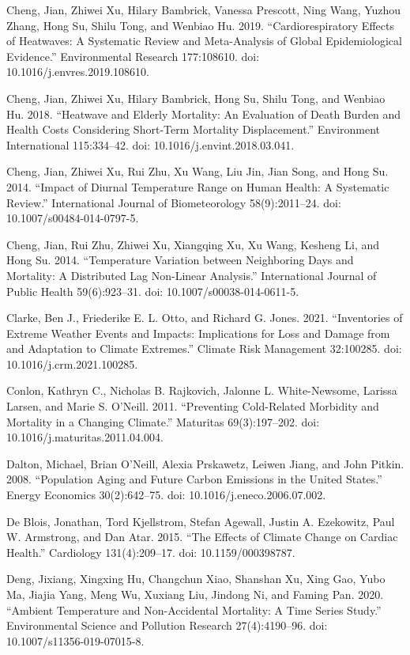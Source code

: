\documentclass[12pt]{article}
\begin{document}
Cheng, Jian, Zhiwei Xu, Hilary Bambrick, Vanessa Prescott, Ning Wang,
Yuzhou Zhang, Hong Su, Shilu Tong, and Wenbiao Hu. 2019.
``Cardiorespiratory Effects of Heatwaves: A Systematic Review and
Meta-Analysis of Global Epidemiological Evidence.'' Environmental
Research 177:108610. doi: 10.1016/j.envres.2019.108610.

Cheng, Jian, Zhiwei Xu, Hilary Bambrick, Hong Su, Shilu Tong, and
Wenbiao Hu. 2018. ``Heatwave and Elderly Mortality: An Evaluation of
Death Burden and Health Costs Considering Short-Term Mortality
Displacement.'' Environment International 115:334--42. doi:
10.1016/j.envint.2018.03.041.

Cheng, Jian, Zhiwei Xu, Rui Zhu, Xu Wang, Liu Jin, Jian Song, and Hong
Su. 2014. ``Impact of Diurnal Temperature Range on Human Health: A
Systematic Review.'' International Journal of Biometeorology
58(9):2011--24. doi: 10.1007/s00484-014-0797-5.

Cheng, Jian, Rui Zhu, Zhiwei Xu, Xiangqing Xu, Xu Wang, Kesheng Li, and
Hong Su. 2014. ``Temperature Variation between Neighboring Days and
Mortality: A Distributed Lag Non-Linear Analysis.'' International
Journal of Public Health 59(6):923--31. doi: 10.1007/s00038-014-0611-5.

Clarke, Ben J., Friederike E. L. Otto, and Richard G. Jones. 2021.
``Inventories of Extreme Weather Events and Impacts: Implications for
Loss and Damage from and Adaptation to Climate Extremes.'' Climate Risk
Management 32:100285. doi: 10.1016/j.crm.2021.100285.

Conlon, Kathryn C., Nicholas B. Rajkovich, Jalonne L. White-Newsome,
Larissa Larsen, and Marie S. O'Neill. 2011. ``Preventing Cold-Related
Morbidity and Mortality in a Changing Climate.'' Maturitas
69(3):197--202. doi: 10.1016/j.maturitas.2011.04.004.

Dalton, Michael, Brian O'Neill, Alexia Prskawetz, Leiwen Jiang, and John
Pitkin. 2008. ``Population Aging and Future Carbon Emissions in the
United States.'' Energy Economics 30(2):642--75. doi:
10.1016/j.eneco.2006.07.002.

De Blois, Jonathan, Tord Kjellstrom, Stefan Agewall, Justin A.
Ezekowitz, Paul W. Armstrong, and Dan Atar. 2015. ``The Effects of
Climate Change on Cardiac Health.'' Cardiology 131(4):209--17. doi:
10.1159/000398787.

Deng, Jixiang, Xingxing Hu, Changchun Xiao, Shanshan Xu, Xing Gao, Yubo
Ma, Jiajia Yang, Meng Wu, Xuxiang Liu, Jindong Ni, and Faming Pan. 2020.
``Ambient Temperature and Non-Accidental Mortality: A Time Series
Study.'' Environmental Science and Pollution Research 27(4):4190--96.
doi: 10.1007/s11356-019-07015-8.
\end{document}
